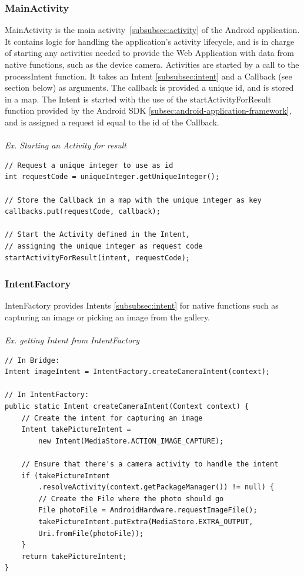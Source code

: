 \subsubsection{MainActivity} 
MainActivity is the main activity~\ref{subsubsec:activity} of the Android application. It contains logic for handling the application's activity lifecycle, and is in charge of starting any activities needed to provide the Web Application with data from native functions, such as the device camera. Activities are started by a call to the processIntent function. It takes an Intent \ref{subsubsec:intent} and a Callback (see section below) as arguments. The callback is provided a unique id, and is stored in a map. The Intent is started with the use of the startActivityForResult function provided by the Android SDK \ref{subsec:android-application-framework}, and is assigned a request id equal to the id of the Callback. 
\\\\
	
\emph{Ex. Starting an Activity for result}
\begin{lstlisting}
// Request a unique integer to use as id
int requestCode = uniqueInteger.getUniqueInteger();

// Store the Callback in a map with the unique integer as key	
callbacks.put(requestCode, callback);
   
// Start the Activity defined in the Intent, 
// assigning the unique integer as request code
startActivityForResult(intent, requestCode);
\end{lstlisting}
	
\subsubsection{IntentFactory} 
IntenFactory provides Intents \ref{subsubsec:intent} for native functions such as capturing an image or picking an image from the gallery.
	\\\\
	\emph{Ex. getting Intent from IntentFactory}
	
	\begin{lstlisting}
// In Bridge:
Intent imageIntent = IntentFactory.createCameraIntent(context);
		
// In IntentFactory:
public static Intent createCameraIntent(Context context) {
	// Create the intent for capturing an image
	Intent takePictureIntent = 
		new Intent(MediaStore.ACTION_IMAGE_CAPTURE);
	
	// Ensure that there's a camera activity to handle the intent
	if (takePictureIntent
		.resolveActivity(context.getPackageManager()) != null) {
		// Create the File where the photo should go
		File photoFile = AndroidHardware.requestImageFile();
		takePictureIntent.putExtra(MediaStore.EXTRA_OUTPUT,
		Uri.fromFile(photoFile));
	}
	return takePictureIntent;
}
\end{lstlisting}
	
